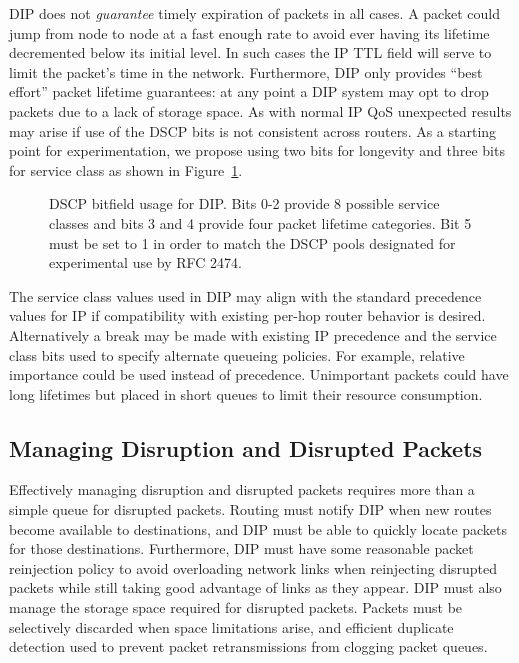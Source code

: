 \documentclass[10pt,letterpaper]{article}
\begin{document}
DIP does not {\em guarantee} timely expiration of packets in all cases.
A packet could jump from node to node at a fast enough rate to
avoid ever having its lifetime decremented below its initial level.
In such cases the IP TTL field will serve to limit the packet's time
in the network. Furthermore, DIP only
provides ``best effort'' packet lifetime guarantees: at any point a
DIP system may opt to drop packets due to a lack of storage space.
As with normal IP QoS unexpected results
may arise if use of the DSCP bits is not consistent across routers.
As a starting point for experimentation, we propose using two bits
for longevity and three bits for service class
as shown in Figure~\ref{figure:dscp_bits}.
\begin{figure}
\centerline{
}
\caption{\footnotesize DSCP bitfield usage for DIP. Bits 0-2 provide
8 possible service classes and bits 3 and 4 provide four packet lifetime
categories. Bit 5 must be set to 1 in order
to match the DSCP pools designated for experimental use by RFC 2474.}
\label{figure:dscp_bits}
\end{figure}
The service class values used in DIP may align with the standard
precedence values for IP if compatibility with existing per-hop router
behavior is desired. Alternatively
a break may be made with existing IP precedence and the
service class bits used to specify alternate queueing policies.
For example, relative importance could be used instead of precedence.
Unimportant packets could have long lifetimes but placed in short queues
to limit their resource consumption.

\subsection{Managing Disruption and Disrupted Packets}
Effectively managing disruption and disrupted packets requires more
than a simple queue for disrupted packets. Routing must notify
DIP when new routes become available to destinations, and DIP must
be able to quickly locate packets for those destinations. Furthermore,
DIP must have some reasonable packet reinjection policy to avoid
overloading network links when reinjecting disrupted packets while still
taking good advantage of links as they appear. DIP must also manage the
storage space required for disrupted packets. Packets must be selectively
discarded when space limitations arise, and efficient duplicate detection
used to prevent packet retransmissions from clogging packet queues.
\end{document}
